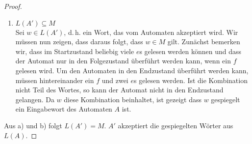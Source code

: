 \documentclass[a4paper]{scrartcl}
\begin{document}
\begin{enumerate}
\begin{proof}
\begin{enumerate}
                \item $L(A') \subseteq M$ \\
                    Sei $w \in L(A')$, d.\,h. ein Wort, das vom Automaten
                    akzeptiert wird.
                    Wir müssen nun zeigen, dass daraus folgt, dass $w \in M$
                    gilt.
                    Zunächst bemerken wir, dass im Startzustand beliebig viele
                    $e$s gelesen werden können und dass der Automat nur in den
                    Folgezustand überführt werden kann, wenn ein $f$ gelesen
                    wird.
                    Um den Automaten in den Endzustand überführt werden kann,
                    müssen hintereinander ein $f$ und zwei $e$s gelesen werden.
                    Ist die Kombination nicht Teil des Wortes, so kann der
                    Automat nicht in den Endzustand gelangen.
                    Da $w$ diese Kombination beinhaltet, ist gezeigt dass $w$
                    gespiegelt ein Eingabewort des Automaten $A$ ist.
            \end{enumerate}
            Aus a) und b) folgt $L(A') = M$.
            $A'$ akzeptiert die gespiegelten Wörter aus $L(A)$.
        \end{proof}

    	
\end{enumerate}
\end{document}
